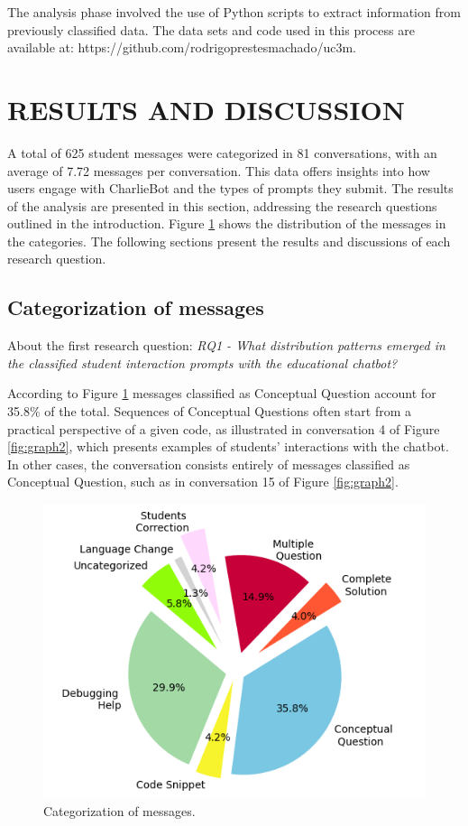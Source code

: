 \documentclass[a4paper,twoside]{article}
\begin{document}
The analysis phase involved the use of Python scripts to extract information
from previously classified data. The data sets and code used in this process are
available at: https://github.com/rodrigoprestesmachado/uc3m.

\section{\uppercase{Results and Discussion}}

A total of 625 student messages were categorized in 81 conversations, with
an average of 7.72 messages per conversation. This data offers insights into how
users engage with CharlieBot and the types of prompts they submit. The results
of the analysis are presented in this section, addressing the research questions
outlined in the introduction. Figure \ref{fig:graph1} shows the distribution of
the messages in the categories. The following sections present the results and
discussions of each research question.

\subsection{Categorization of messages}

About the first research question: \textit{RQ1 - What distribution patterns
emerged in the classified student interaction prompts with the educational
chatbot?}

According to Figure \ref{fig:graph1} messages classified as
Conceptual Question account for 35.8\% of the total. Sequences of Conceptual
Questions often start from a practical perspective of a given code, as
illustrated in conversation 4 of Figure \ref{fig:graph2}, which presents
examples of students' interactions with the chatbot. In other cases, the
conversation consists entirely of messages classified as Conceptual Question,
such as in conversation 15 of Figure \ref{fig:graph2}.

\begin{figure}[h!]
  \centering
  \includegraphics[scale=0.62]{img/figure1.png}
  \caption{Categorization of messages.}
  \label{fig:graph1}
\end{figure}
\end{document}
